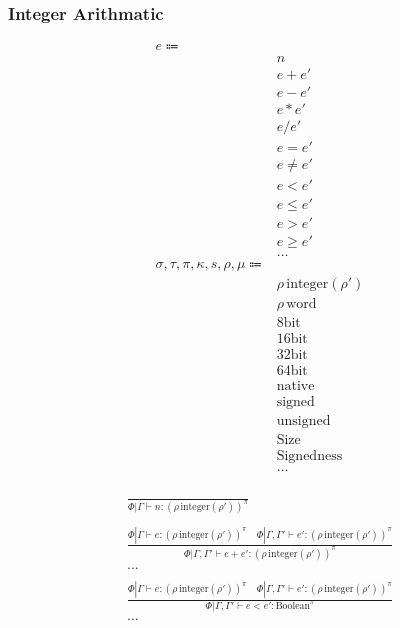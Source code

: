 \documentclass {article}
\begin{document}
\subsubsection{Integer Arithmatic}
\begin{align*}
e \Coloneqq & \\
& n \tag{Numeric Literal} \\
& e + e' \tag{Addition} \\
& e - e' \tag{Subtraction} \\
& e * e' \tag{Multiplication} \\
& e / e' \tag{Division} \\
& e = e' \tag {Equality} \\
& e \neq e' \tag {Inequality} \\
& e < e' \tag {Less Then} \\
& e \leq e' \tag {Less Then Equal} \\
& e > e' \tag {Greater Then} \\
& e \geq e' \tag {Greater Then Equal} \\
& \dots \\
\sigma, \tau, \pi, \kappa, s, \rho, \mu \Coloneqq & \\
& \rho \, \text{integer} (\rho') \tag{Number} \\
& \rho \, \text{word} \tag{Word Representation} \\
& 8\text{bit} \tag{Byte Size} \\
& 16\text{bit} \tag{Short Size} \\
& 32\text{bit} \tag{Int Size} \\
& 64\text{bit} \tag{Long Size} \\
& \text{native} \tag{Native Size} \\
& \text{signed} \tag{Signed} \\
& \text{unsigned} \tag{Unsigned} \\
& \text{Size} \tag{Size Sort}\\
& \text{Signedness} \tag{Signedness Sort}\\
& \dots \\
\end{align*}

\begin{gather*}
\frac
{}
{\Phi | \Gamma \vdash n : (\rho \, \text{integer}(\rho'))^\pi} \\
\\
\frac
{\Phi | \Gamma \vdash e : (\rho \, \text{integer}(\rho'))^\pi \quad \Phi | \Gamma, \Gamma' \vdash e' :(\rho \, \text{integer}(\rho'))^\pi}
{\Phi | \Gamma, \Gamma' \vdash e + e' : (\rho \, \text{integer}(\rho'))^\pi} \\
\dots \\
\\
\frac
{\Phi | \Gamma \vdash e : (\rho \, \text{integer}(\rho'))^\pi \quad \Phi | \Gamma, \Gamma' \vdash e' : (\rho \, \text{integer}(\rho'))^\pi}
{\Phi | \Gamma, \Gamma' \vdash e < e' : \text{Boolean}^\pi} \\
\dots
\end{gather*}
\end{document}
